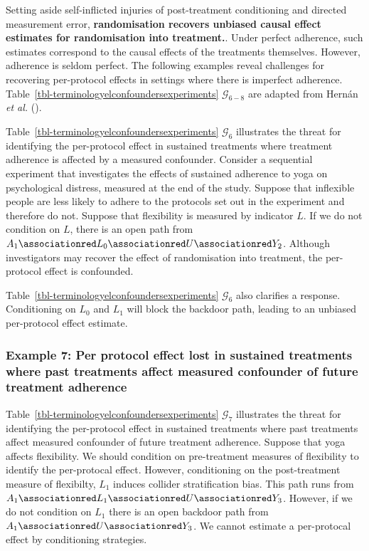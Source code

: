 \documentclass[
  single column]{article}
\begin{document}
Setting aside self-inflicted injuries of post-treatment conditioning and
directed measurement error, \textbf{randomisation recovers unbiased
causal effect estimates for randomisation into treatment.}. Under
perfect adherence, such estimates correspond to the causal effects of
the treatments themselves. However, adherence is seldom perfect. The
following examples reveal challenges for recovering per-protocol effects
in settings where there is imperfect adherence.
Table~\ref{tbl-terminologyelconfoundersexperiments}
\(\mathcal{G}_{6-8}\) are adapted from Hernán \emph{et al.}
().

Table~\ref{tbl-terminologyelconfoundersexperiments} \(\mathcal{G}_{6}\)
illustrates the threat for identifying the per-protocol effect in
sustained treatments where treatment adherence is affected by a measured
confounder. Consider a sequential experiment that investigates the
effects of sustained adherence to yoga on psychological distress,
measured at the end of the study. Suppose that inflexible people are
less likely to adhere to the protocols set out in the experiment and
therefore do not. Suppose that flexibility is measured by indicator
\(L\). If we do not condition on \(L\), there is an open path from
\(A_1 \associationred L_0 \associationred U \associationred Y_2\).
Although investigators may recover the effect of randomisation into
treatment, the per-protocol effect is confounded.

Table~\ref{tbl-terminologyelconfoundersexperiments} \(\mathcal{G}_{6}\)
also clarifies a response. Conditioning on \(L_0\) and \(L_1\) will
block the backdoor path, leading to an unbiased per-protocol effect
estimate.

\subsubsection{Example 7: Per protocol effect lost in sustained
treatments where past treatments affect measured confounder of future
treatment
adherence}\label{example-7-per-protocol-effect-lost-in-sustained-treatments-where-past-treatments-affect-measured-confounder-of-future-treatment-adherence}

Table~\ref{tbl-terminologyelconfoundersexperiments} \(\mathcal{G}_{7}\)
illustrates the threat for identifying the per-protocol effect in
sustained treatments where past treatments affect measured confounder of
future treatment adherence. Suppose that yoga affects flexibility. We
should condition on pre-treatment measures of flexibility to identify
the per-protocal effect. However, conditioning on the post-treatment
measure of flexibilty, \(\boxed{L_1}\) induces collider stratification
bias. This path runs from
\(A_1 \associationred L_1 \associationred U \associationred Y_3\).
However, if we do not condition on \(L_1\) there is an open backdoor
path from \(A_1 \associationred U \associationred Y_3\). We cannot
estimate a per-protocal effect by conditioning strategies.
\end{document}
